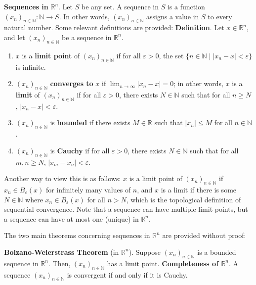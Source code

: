 \begin{framed}
    \textbf{Sequences in} $\mathbb{R}^n$. Let $S$ be any set. A sequence in $S$ is a function $(x_n)_{n\in\mathbb{N}}:\mathbb{N}\to S$. In other words, $(x_n)_{n\in\mathbb{N}}$ assigns a value in $S$ to every natural number. Some relevant definitions are provided:
    \textbf{Definition}. Let $x\in\mathbb{R}^n$, and let $(x_n)_{n\in \mathbb{N}}$ be a sequence in $\mathbb{R}^n$.
    \vspace{-1em}
    \begin{enumerate}
        \item $x$ is a \textbf{limit point} of $(x_n)_{n\in\mathbb{N}}$ if for all $\varepsilon>0$, the set $\{n\in\mathbb{N}\mid |x_n-x|<\varepsilon\}$ is infinite.
        \item $(x_n)_{n\in\mathbb{N}}$ \textbf{converges to} $x$ if $\displaystyle\lim_{n\to\infty} |x_n-x| = 0$; in other words, $x$ is a \textbf{limit} of $(x_n)_{n\in\mathbb{N}}$ if for all $\varepsilon>0$, there exists $N\in\mathbb{N}$ such that for all $n\geq N$, $|x_n-x|<\varepsilon$.
        \item $(x_n)_{n\in\mathbb{N}}$ is \textbf{bounded} if there exists $M\in\mathbb{R}$ such that $|x_n|\leq M$ for all $n\in\mathbb{N}$.
        \item $(x_n)_{n\in\mathbb{N}}$ is \textbf{Cauchy} if for all $\varepsilon>0$, there exists $N\in \mathbb{N}$ such that for all $m,n\geq N$, $|x_m-x_n|<\varepsilon$.
    \end{enumerate}
\end{framed}
Another way to view this is as follows: $x$ is a limit point of $(x_n)_{n\in\mathbb{N}}$ if $x_n\in B_\varepsilon(x)$ for infinitely many values of $n$, and $x$ is a limit if there is some $N\in\mathbb{N}$ where $x_n\in B_\varepsilon(x)$ for all $n>N$, which is the topological definition of sequential convergence. Note that a sequence can have multiple limit points, but a sequence can have at most one (unique) in $\mathbb{R}^n$.

The two main theorems concerning sequences in $\mathbb{R}^n$ are provided without proof:

\textbf{Bolzano-Weierstrass Theorem} (in $\mathbb{R}^n$). Suppose $(x_n)_{n\in\mathbb{N}}$ is a bounded sequence in $\mathbb{R}^n$. Then, $(x_n)_{n\in\mathbb{N}}$ has a limit point.
\textbf{Completeness of $\mathbb{R}^n$}. A sequence $(x_n)_{n\in\mathbb{N}}$ is convergent if and only if it is Cauchy.

